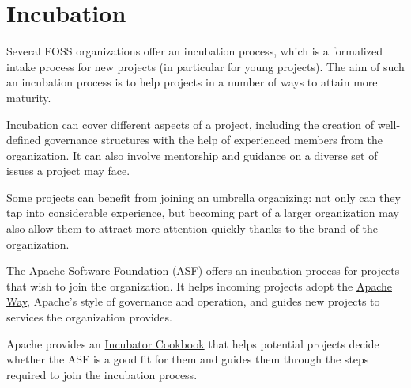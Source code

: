 


\chapter{Incubation}

Several FOSS organizations offer an incubation process, which is a formalized intake process for new projects (in particular for young projects).  The aim of such an incubation process is to help projects in a number of ways to attain more maturity.

Incubation can cover different aspects of a project, including the creation of well-defined governance structures with the help of experienced members from the organization.  It can also involve mentorship and guidance on a diverse set of issues a project may face.

Some projects can benefit from joining an umbrella organizing: not only can they tap into considerable experience, but becoming part of a larger organization may also allow them to attract more attention quickly thanks to the brand of the organization.

\begin{kaobox}[frametitle=Apache Incubator]

The \href{https://apache.org/}{Apache Software Foundation} (ASF) offers an \href{https://incubator.apache.org/}{incubation process} for projects that wish to join the organization.  It helps incoming projects adopt the \href{https://apache.org/theapacheway/}{Apache Way}, Apache's style of governance and operation, and guides new projects to services the organization provides.

Apache provides an \href{https://incubator.apache.org/cookbook/}{Incubator Cookbook} that helps potential projects decide whether the ASF is a good fit for them and guides them through the steps required to join the incubation process.

\end{kaobox}

